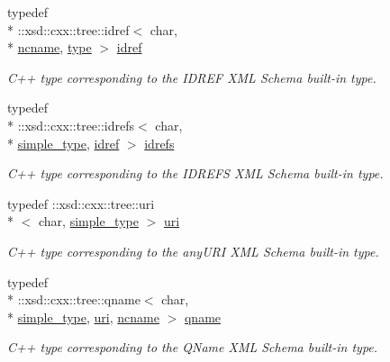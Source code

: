 \begin{DoxyCompactItemize}
typedef \\*
\-::xsd\-::cxx\-::tree\-::idref$<$ char, \\*
\hyperlink{namespacexml__schema_adb64d7469eb27804ae649fbaccba54d6}{ncname}, \hyperlink{namespacexml__schema_a4bf7f144ce936a6a393de26f4cb707f0}{type} $>$ \hyperlink{namespacexml__schema_a50fe7403f3e6be3634976c84c1ea1f8c}{idref}
\begin{DoxyCompactList}\small\item\em C++ type corresponding to the I\-D\-R\-E\-F X\-M\-L Schema built-\/in type. \end{DoxyCompactList}\item 
typedef \\*
\-::xsd\-::cxx\-::tree\-::idrefs$<$ char, \\*
\hyperlink{namespacexml__schema_ab0835e08cd73a2d842f597be0bdecafc}{simple\-\_\-type}, \hyperlink{namespacexml__schema_a50fe7403f3e6be3634976c84c1ea1f8c}{idref} $>$ \hyperlink{namespacexml__schema_aac27fe5af9a5b2ee009fd3c9abe3abe9}{idrefs}
\begin{DoxyCompactList}\small\item\em C++ type corresponding to the I\-D\-R\-E\-F\-S X\-M\-L Schema built-\/in type. \end{DoxyCompactList}\item 
typedef \-::xsd\-::cxx\-::tree\-::uri\\*
$<$ char, \hyperlink{namespacexml__schema_ab0835e08cd73a2d842f597be0bdecafc}{simple\-\_\-type} $>$ \hyperlink{namespacexml__schema_aad28b7e5769e04950db7f4bd15c163be}{uri}
\begin{DoxyCompactList}\small\item\em C++ type corresponding to the any\-U\-R\-I X\-M\-L Schema built-\/in type. \end{DoxyCompactList}\item 
typedef \\*
\-::xsd\-::cxx\-::tree\-::qname$<$ char, \\*
\hyperlink{namespacexml__schema_ab0835e08cd73a2d842f597be0bdecafc}{simple\-\_\-type}, \hyperlink{namespacexml__schema_aad28b7e5769e04950db7f4bd15c163be}{uri}, \hyperlink{namespacexml__schema_adb64d7469eb27804ae649fbaccba54d6}{ncname} $>$ \hyperlink{namespacexml__schema_a5343b1a86a36b809f1acf953a2497af2}{qname}
\begin{DoxyCompactList}\small\item\em C++ type corresponding to the Q\-Name X\-M\-L Schema built-\/in type. \end{DoxyCompactList}\item 

\end{DoxyCompactItemize}
